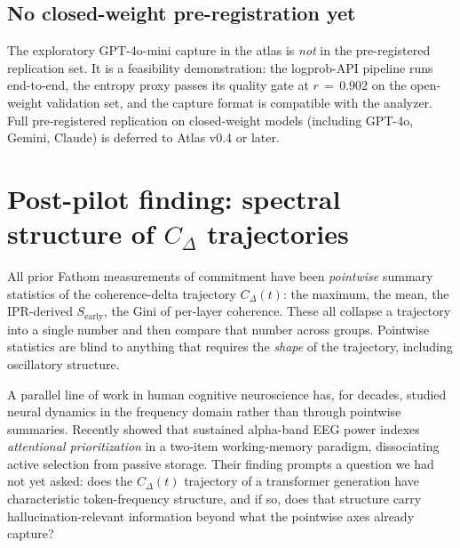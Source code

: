 \documentclass[11pt,letterpaper]{article}
\begin{document}
\subsection{No closed-weight pre-registration yet}

The exploratory GPT-4o-mini capture in the atlas is \emph{not} in the
pre-registered replication set. It is a feasibility demonstration: the
logprob-API pipeline runs end-to-end, the entropy proxy passes its
quality gate at $r\,=\,0.902$ on the open-weight validation set, and the
capture format is compatible with the analyzer. Full pre-registered
replication on closed-weight models (including GPT-4o, Gemini, Claude)
is deferred to Atlas v0.4 or later.

\section{Post-pilot finding: spectral structure of $C_\Delta$ trajectories}
\label{sec:spectral}

All prior Fathom measurements of commitment have been \emph{pointwise}
summary statistics of the coherence-delta trajectory $C_\Delta(t)$:
the maximum, the mean, the IPR-derived $S_{\text{early}}$, the Gini of
per-layer coherence. These all collapse a trajectory into a single
number and then compare that number across groups. Pointwise statistics
are blind to anything that requires the \emph{shape} of the trajectory,
including oscillatory structure.

A parallel line of work in human cognitive neuroscience has, for
decades, studied neural dynamics in the frequency domain rather than
through pointwise summaries. Recently \citet{weng2026sustained} showed
that sustained alpha-band EEG power indexes \emph{attentional
prioritization} in a two-item working-memory paradigm, dissociating
active selection from passive storage. Their finding prompts a question
we had not yet asked: does the $C_\Delta(t)$ trajectory of a transformer
generation have characteristic token-frequency structure, and if so,
does that structure carry hallucination-relevant information beyond
what the pointwise axes already capture?
\end{document}
